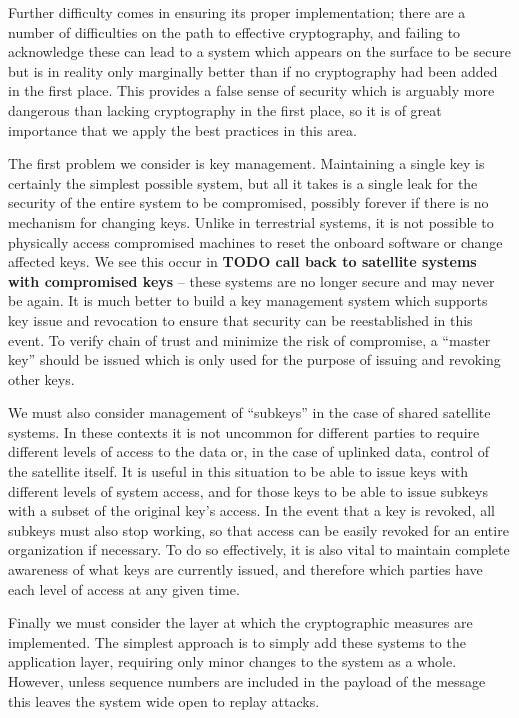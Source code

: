 Further difficulty comes in ensuring its proper implementation; there are a number of difficulties on the path to effective cryptography, and failing to acknowledge these can lead to a system which appears on the surface to be secure but is in reality only marginally better than if no cryptography had been added in the first place.
This provides a false sense of security which is arguably more dangerous than lacking cryptography in the first place, so it is of great importance that we apply the best practices in this area.

The first problem we consider is key management.
Maintaining a single key is certainly the simplest possible system, but all it takes is a single leak for the security of the entire system to be compromised, possibly forever if there is no mechanism for changing keys.
Unlike in terrestrial systems, it is not possible to physically access compromised machines to reset the onboard software or change affected keys.
We see this occur in \textbf{TODO call back to satellite systems with compromised keys} -- these systems are no longer secure and may never be again.
It is much better to build a key management system which supports key issue and revocation to ensure that security can be reestablished in this event.
To verify chain of trust and minimize the risk of compromise, a ``master key'' should be issued which is only used for the purpose of issuing and revoking other keys.

We must also consider management of ``subkeys'' in the case of shared satellite systems.
In these contexts it is not uncommon for different parties to require different levels of access to the data or, in the case of uplinked data, control of the satellite itself.
It is useful in this situation to be able to issue keys with different levels of system access, and for those keys to be able to issue subkeys with a subset of the original key's access.
In the event that a key is revoked, all subkeys must also stop working, so that access can be easily revoked for an entire organization if necessary.
To do so effectively, it is also vital to maintain complete awareness of what keys are currently issued, and therefore which parties have each level of access at any given time.

Finally we must consider the layer at which the cryptographic measures are implemented.
The simplest approach is to simply add these systems to the application layer, requiring only minor changes to the system as a whole.
However, unless sequence numbers are included in the payload of the message this leaves the system wide open to replay attacks.

